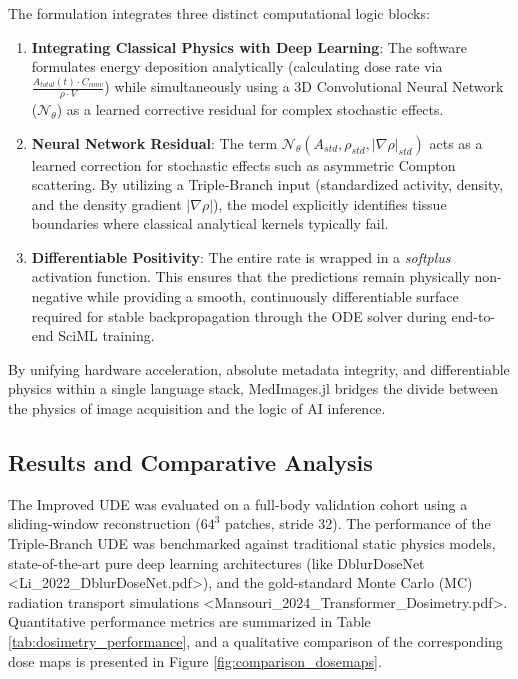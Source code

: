 \documentclass[10pt,letterpaper]{article}
\begin{document}
The formulation integrates three distinct computational logic blocks:
\begin{enumerate}
    \item \textbf{Integrating Classical Physics with Deep Learning}: The software formulates energy deposition analytically (calculating dose rate via $\frac{A_{total}(t) \cdot C_{conv}}{\rho \cdot V}$) while simultaneously using a 3D Convolutional Neural Network ($\mathcal{N}_\theta$) as a learned corrective residual for complex stochastic effects.
    \item \textbf{Neural Network Residual}: The term $\mathcal{N}_\theta(A_{std}, \rho_{std}, |\nabla \rho|_{std})$ acts as a learned correction for stochastic effects such as asymmetric Compton scattering. By utilizing a Triple-Branch input (standardized activity, density, and the density gradient $|\nabla \rho|$), the model explicitly identifies tissue boundaries where classical analytical kernels typically fail.
    \item \textbf{Differentiable Positivity}: The entire rate is wrapped in a \textit{softplus} activation function. This ensures that the predictions remain physically non-negative while providing a smooth, continuously differentiable surface required for stable backpropagation through the ODE solver during end-to-end SciML training.
\end{enumerate}
By unifying hardware acceleration, absolute metadata integrity, and differentiable physics within a single language stack, MedImages.jl bridges the divide between the physics of image acquisition and the logic of AI inference.


\subsection{Results and Comparative Analysis}
The Improved UDE was evaluated on a full-body validation cohort using a sliding-window reconstruction ($64^3$ patches, stride 32). The performance of the Triple-Branch UDE was benchmarked against traditional static physics models, state-of-the-art pure deep learning architectures (like DblurDoseNet <Li_2022_DblurDoseNet.pdf>), and the gold-standard Monte Carlo (MC) radiation transport simulations <Mansouri_2024_Transformer_Dosimetry.pdf>. Quantitative performance metrics are summarized in Table \ref{tab:dosimetry_performance}, and a qualitative comparison of the corresponding dose maps is presented in Figure \ref{fig:comparison_dosemaps}.
\end{document}
